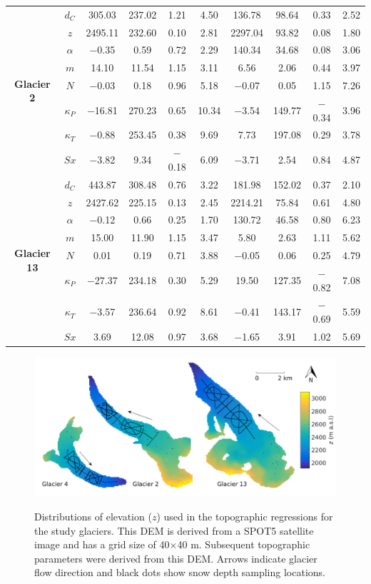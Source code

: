 \documentclass[12pt]{article}
\newcommand{\topomap}{Arrows indicate glacier flow direction and black dots show snow depth sampling locations. }
\begin{document}
\begin{landscape}
\begin{table}[]
\begin{tabular}{cc|cccc|cccc}
\multirow{8}{*}{\textbf{Glacier 2}} & $d_C$ & 305.03 & 237.02 & 1.21 & 4.50 & 136.78 & 98.64 & 0.33 & 2.52 \\
 & $z$ & 2495.11 & 232.60 & 0.10 & 2.81 & 2297.04 & 93.82 & 0.08 & 1.80 \\
 & $\alpha$ &  $-$0.35 & 0.59 & 0.72 & 2.29 & 140.34 & 34.68 & 0.08 & 3.06 \\
 & $m$ & 14.10 & 11.54 & 1.15 & 3.11 & 6.56 & 2.06 & 0.44 & 3.97 \\
 & $N$ &  $-$0.03 & 0.18 & 0.96 & 5.18 &  $-$0.07 & 0.05 & 1.15 & 7.26 \\
 & $\kappa_P$ &  $-$16.81 & 270.23 & 0.65 & 10.34 &  $-$3.54 & 149.77 &  $-$0.34 & 3.96 \\
 & $\kappa_T$ &  $-$0.88 & 253.45 & 0.38 & 9.69 & 7.73 & 197.08 & 0.29 & 3.78 \\
 & $Sx$ &  $-$3.82 & 9.34 &  $-$0.18 & 6.09 &  $-$3.71 & 2.54 & 0.84 & 4.87 \\ \hline
\multirow{8}{*}{\textbf{Glacier 13}} & $d_C$ & 443.87 & 308.48 & 0.76 & 3.22 & 181.98 & 152.02 & 0.37 & 2.10 \\
 & $z$ & 2427.62 & 225.15 & 0.13 & 2.45 & 2214.21 & 75.84 & 0.61 & 4.80 \\
 & $\alpha$ &  $-$0.12 & 0.66 & 0.25 & 1.70 & 130.72 & 46.58 & 0.80 & 6.23 \\
 & $m$ & 15.00 & 11.90 & 1.15 & 3.47 & 5.80 & 2.63 & 1.11 & 5.62 \\
 & $N$ & 0.01 & 0.19 & 0.71 & 3.88 &  $-$0.05 & 0.06 & 0.25 & 4.79 \\
 & $\kappa_P$ &  $-$27.37 & 234.18 & 0.30 & 5.29 & 19.50 & 127.35 &  $-$0.82 & 7.08 \\
 & $\kappa_T$ &  $-$3.57 & 236.64 & 0.92 & 8.61 &  $-$0.41 & 143.17 &  $-$0.69 & 5.59 \\
 & $Sx$ & 3.69 & 12.08 & 0.97 & 3.68 &  $-$1.65 & 3.91 & 1.02 & 5.69
\end{tabular}
\end{table}
\end{landscape}

\pagebreak
\begin{figure}[H]
	\centering
	\includegraphics[width = \textwidth]{Map_elevation.png}\\
	\caption{Distributions of elevation ($z$) used in the topographic regressions for the study glaciers. This DEM is derived from a SPOT5 satellite image and has a grid size of 40$\times$40 m. Subsequent topographic parameters were derived from this DEM. \topomap}
	\label{map:elev}
\end{figure}
\end{document}
